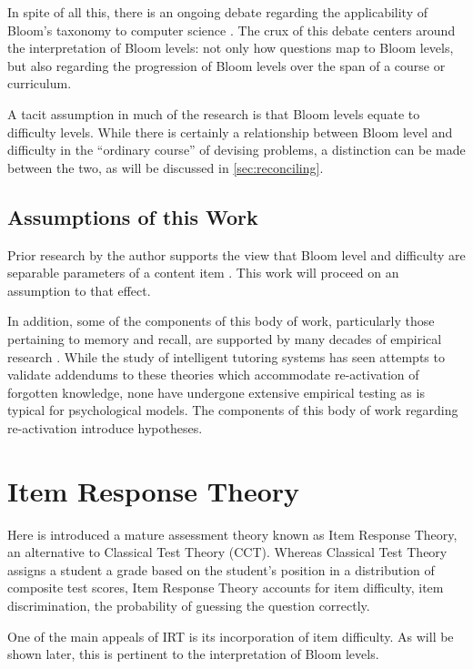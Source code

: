 In spite of all this, there is an ongoing debate regarding the applicability of
Bloom's taxonomy to computer science \cite{johnson2006bloom,
fuller2007developing, thompson2008bloom}.  The crux of this debate centers
around the interpretation of Bloom levels: not only how questions map to Bloom
levels, but also regarding the progression of Bloom levels over the span of a
course or curriculum.  

A tacit assumption in much of the research is that Bloom levels equate to
difficulty levels.  While there is certainly a relationship between Bloom level
and difficulty in the ``ordinary course'' of devising problems, a distinction
can be made between the two, as will be discussed in \ref{sec:reconciling}.

\subsection{Assumptions of this Work}

Prior research by the author supports the view that Bloom level and difficulty
are separable parameters of a content item \cite{castleberry2016effect}.  This
work will proceed on an assumption to that effect. 

In addition, some of the components of this body of work, particularly those
pertaining to memory and recall, are supported by many decades of empirical
research \cite{ebbinghaus}.  While the study of intelligent tutoring systems
has seen attempts to validate addendums to these theories which accommodate
re-activation of forgotten knowledge, none have undergone extensive empirical
testing as is typical for psychological models.  The components of this body of
work regarding re-activation introduce hypotheses.

\section{Item Response Theory}

Here is introduced a mature assessment theory known as Item Response Theory, an
alternative to Classical Test Theory (CCT).  Whereas Classical Test Theory
assigns a student a grade based on the student's position in a distribution of
composite test scores, Item Response Theory accounts for item difficulty, item
discrimination, the probability of guessing the question correctly.

One of the main appeals of IRT is its incorporation of item difficulty.  As
will be shown later, this is pertinent to the interpretation of Bloom levels.  

